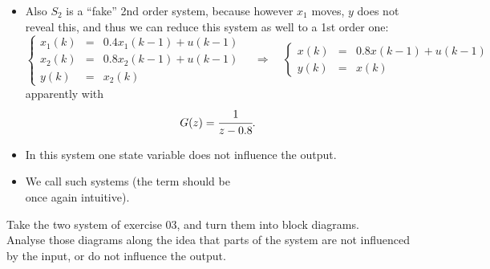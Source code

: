 \begin{frame}
\myPause
 \begin{itemize}[<+-| alert@+>]
 \item Also $S_2$ is a ``fake'' 2nd order system, because however $x_1$ moves, $y$ does not
       reveal this, and thus we can reduce this system as well to a 1st order one:
       \begin{displaymath}
        \left\{\begin{array}{rcl}
         x_1(k) &=& 0.4x_1(k-1)+u(k-1)\\
         x_2(k) &=& 0.8x_2(k-1)+u(k-1)\\
         y(k)   &=& x_2(k)
        \end{array}\right. \quad
        \Rightarrow \quad
        \left\{\begin{array}{rcl}
         x(k) &=& 0.8x(k-1)+u(k-1)\\
         y(k) &=& x(k)
        \end{array}\right.
        \end{displaymath} 
        apparently with
        \begin{displaymath}
         G(z)=\cfrac{1}{z-0.8}.
        \end{displaymath} 
 \item In this system one state variable does not influence the output.
 \item We call such systems  (the term should be\\
       once again intuitive).
 \end{itemize}
\end{frame}

\begin{frame}
\myPause
 Take the two system of exercise 03, and turn them into block diagrams.\\
 \vspace{5mm}Analyse those diagrams along the idea that parts of the system are not influenced
 by the input, or do not influence the output. 
\end{frame}



